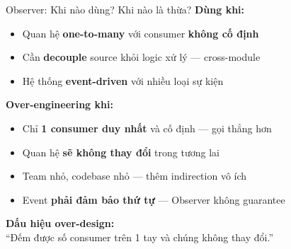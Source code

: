\begin{frame}{Observer: Khi nào dùng? Khi nào là thừa?}
  \textcolor{mygreen}{\textbf{Dùng khi:}}
  \begin{itemize}
    \item Quan hệ \textbf{one-to-many} với consumer \textbf{không cố định}
    \item Cần \textbf{decouple} source khỏi logic xử lý --- cross-module
    \item Hệ thống \textbf{event-driven} với nhiều loại sự kiện
  \end{itemize}

  \vspace{0.3em}
  \textcolor{myred}{\textbf{Over-engineering khi:}}
  \begin{itemize}
    \item Chỉ \textbf{1 consumer duy nhất} và cố định --- gọi thẳng hơn
    \item Quan hệ \textbf{sẽ không thay đổi} trong tương lai
    \item Team nhỏ, codebase nhỏ --- thêm indirection vô ích
    \item Event \textbf{phải đảm bảo thứ tự} --- Observer không guarantee
  \end{itemize}

  \vspace{0.3em}
  \centering
  \textcolor{myorange}{\textbf{Dấu hiệu over-design:}}\\[0.2em]
  {\small ``Đếm được số consumer trên 1 tay và chúng không thay đổi.''}
\end{frame}
